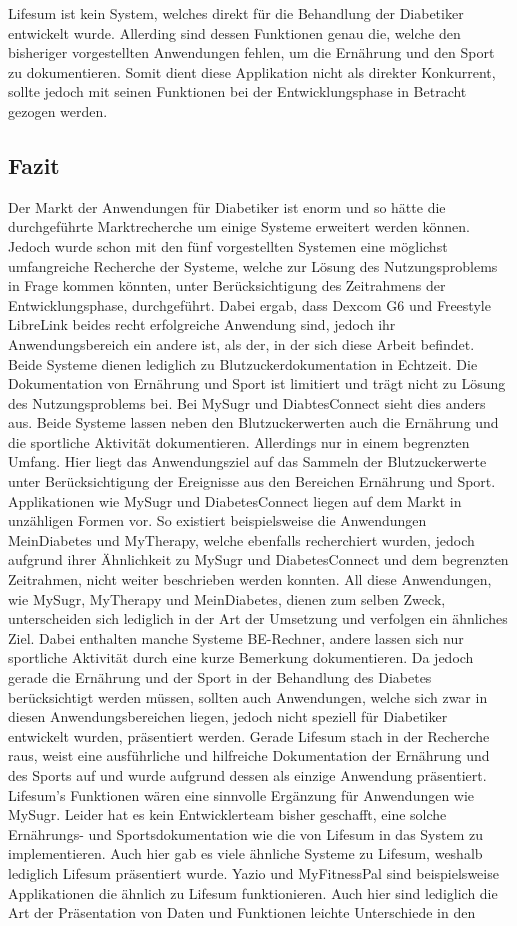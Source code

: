\documentclass[a4paper,11pt]{article}%
\renewcommand{\\}{\vspace*{0.5\baselineskip} \newline}
\begin{document}
	\setlength{\parindent}{0pt}Lifesum ist kein System, welches direkt für die Behandlung der Diabetiker entwickelt wurde. Allerding sind dessen Funktionen genau die, welche den bisheriger vorgestellten Anwendungen fehlen, um die Ernährung und den Sport zu dokumentieren. Somit dient diese Applikation nicht als direkter Konkurrent, sollte jedoch mit seinen Funktionen bei der Entwicklungsphase in Betracht gezogen werden. 
	\subsection{Fazit}
	Der Markt der Anwendungen für Diabetiker ist enorm und so hätte die durchgeführte Marktrecherche um einige Systeme erweitert werden können. Jedoch wurde schon mit den fünf vorgestellten Systemen eine möglichst umfangreiche Recherche der Systeme, welche zur Lösung des Nutzungsproblems in Frage kommen könnten, unter Berücksichtigung des Zeitrahmens der Entwicklungsphase, durchgeführt. Dabei ergab, dass Dexcom G6 und Freestyle LibreLink beides recht erfolgreiche Anwendung sind, jedoch ihr Anwendungsbereich ein andere ist, als der, in der sich diese Arbeit befindet. Beide Systeme dienen lediglich zu Blutzuckerdokumentation in Echtzeit. Die Dokumentation von Ernährung und Sport ist limitiert und trägt nicht zu Lösung des Nutzungsproblems bei. Bei MySugr und DiabtesConnect sieht dies anders aus. Beide Systeme lassen neben den Blutzuckerwerten auch die Ernährung und die sportliche Aktivität dokumentieren. Allerdings nur in einem begrenzten Umfang. Hier liegt das Anwendungsziel auf das Sammeln der Blutzuckerwerte unter Berücksichtigung der Ereignisse aus den Bereichen Ernährung und Sport. Applikationen wie MySugr und DiabetesConnect liegen auf dem Markt in unzähligen Formen vor. So existiert beispielsweise die Anwendungen MeinDiabetes und MyTherapy, welche ebenfalls recherchiert wurden, jedoch aufgrund ihrer Ähnlichkeit zu MySugr und DiabetesConnect und dem begrenzten Zeitrahmen, nicht weiter beschrieben werden konnten. All diese Anwendungen, wie MySugr, MyTherapy und MeinDiabetes, dienen zum selben Zweck, unterscheiden sich lediglich in der Art der Umsetzung und verfolgen ein ähnliches Ziel. Dabei enthalten manche Systeme BE-Rechner, andere lassen sich nur sportliche Aktivität durch eine kurze Bemerkung dokumentieren. Da jedoch gerade die Ernährung und der Sport in der Behandlung des Diabetes berücksichtigt werden müssen, sollten auch Anwendungen, welche sich zwar in diesen Anwendungsbereichen liegen, jedoch nicht speziell für Diabetiker entwickelt wurden, präsentiert werden. Gerade Lifesum stach in der Recherche raus, weist eine ausführliche und hilfreiche Dokumentation der Ernährung und des Sports auf und wurde aufgrund dessen als einzige Anwendung präsentiert. Lifesum’s Funktionen wären eine sinnvolle Ergänzung für Anwendungen wie MySugr. Leider hat es kein Entwicklerteam bisher geschafft, eine solche Ernährungs- und Sportsdokumentation wie die von Lifesum in das System zu implementieren. Auch hier gab es viele ähnliche Systeme zu Lifesum, weshalb lediglich Lifesum präsentiert wurde. Yazio und MyFitnessPal sind beispielsweise Applikationen die ähnlich zu Lifesum funktionieren. Auch hier sind lediglich die Art der Präsentation von Daten und Funktionen leichte Unterschiede in den 
\end{document}
